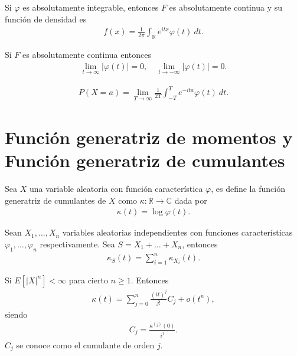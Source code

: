 \begin{teo}
    Si $\varphi$ es absolutamente integrable, entonces $F$ es absolutamente continua y su función de densidad es
    \begin{align*}
        f(x) = \frac{1}{2\pi} \int_{\mathbb{R}} e^{itx} \varphi(t) \ dt.
    \end{align*}
\end{teo}

\begin{lema}
    Si $F$ es absolutamente continua entonces
    \begin{align*}
        \lim_{t \to \infty} |\varphi(t)| = 0, \quad \lim_{t \to -\infty} |\varphi(t)| = 0.
    \end{align*}
\end{lema}

\begin{lema}
    \begin{align*}
        P(X = a) = \lim_{T \to \infty} \frac{1}{2T} \int_{-T}^{T} e^{-ita} \varphi(t) \ dt.
    \end{align*}
\end{lema}

\section{Función generatriz de momentos y Función generatriz de cumulantes}
\begin{defi}
    Sea $X$ una variable aleatoria con función característica $\varphi$, es define la función generatriz de cumulantes de $X$ como $\kappa : \mathbb{R} \longrightarrow \mathbb{C}$ dada por
    \begin{align*}
        \kappa(t) = \log \varphi(t).
    \end{align*}
\end{defi}

\begin{prop}
    Sean $X_1,\ldots, X_n$  variables aleatorias independientes con funciones características $\varphi_1,\ldots,\varphi_n$ respectivamente. Sea $S = X_1 + \ldots + X_n$, entonces
    \begin{align*}
        \kappa_S(t) = \sum_{i=1}^{n} \kappa_{X_i}(t).
    \end{align*}
\end{prop}

\begin{teo}
    Si $E[|X|^n] < \infty$ para cierto $n \ge 1$. Entonces
    \begin{align*}
        \kappa(t) = \sum_{j=0}^{n} \frac{(it)^j}{j!} C_j + o(t^n),
    \end{align*}
    siendo
    \begin{align*}
        C_j = \frac{\kappa^{(j)}(0)}{i^j}.
    \end{align*}
    $C_j$ se conoce como el cumulante de orden $j$.
\end{teo}

